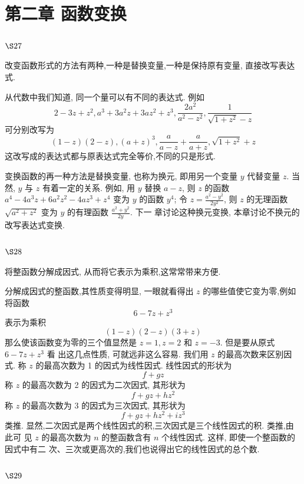 \chapter{第二章 函数变换}

\section{$\S 27$}

改变函数形式的方法有两种,一种是替换变量,一种是保持原有变量, 直接改写表达 式.

从代数中我们知道, 同一个量可以有不同的表达式. 例如
\[
2-3 z+z^{2}, a^{3}+3 a^{2} z+3 a z^{2}+z^{3}, \frac{2 a^{2}}{a^{2}-z^{2}}, \frac{1}{\sqrt{1+z^{2}}-z}
\]
可分别改写为
\[
(1-z)(2-z),(a+z)^{3}, \frac{a}{a-z}+\frac{a}{a+z}, \sqrt{1+z^{2}}+z
\]
这改写成的表达式都与原表达式完全等价,不同的只是形式.

变换函数的再一种方法是替换变量, 也称为换元, 即用另一个变量 $y$ 代替变量 $z$. 当 然, $y$ 与 $z$ 有着一定的关系. 例如, 用 $y$ 替换 $a-z$, 则 $z$ 的函数 $a^{4}-4 a^{3} z+6 a^{2} z^{2}-4 a z^{3}+z^{4}$ 变为 $y$ 的函数 $y^{4}$; 令 $z=\frac{a^{2}-y^{2}}{2 y^{2}}$, 则 $z$ 的无理函数 $\sqrt{a^{2}+z^{2}}$ 变为 $y$ 的有理函数 $\frac{a^{2}+y^{2}}{2 y}$. 下一 章讨论这种换元变换, 本章讨论不换元的改写表达式变换.

\section{$\S 28$}

将整函数分解成因式, 从而将它表示为乘积,这常常带来方便.

分解成因式的整函数,其性质变得明显, 一眼就看得出 $z$ 的哪些值使它变为零,例如 将函数
\[
6-7 z+z^{3}
\]
表示为乘积
\[
(1-z)(2-z)(3+z)
\]
那么使该函数变为零的三个值显然是 $z=1, z=2$ 和 $z=-3$. 但是要从原式 $6-7 z+z^{3}$ 看 出这几点性质, 可就远非这么容易. 我们用 $z$ 的最高次数来区别因式. 称 $z$ 的最高次数为 1 的因式为线性因式. 线性因式的形状为 
\[
f+g z
\]
称 $z$ 的最高次数为 2 的因式为二次因式, 其形状为
\[
f+g z+h z^{2}
\]
称 $z$ 的最高次数为 3 的因式为三次因式, 其形状为
\[
f+g z+h z^{2}+i z^{3}
\]
类推. 显然,二次因式是两个线性因式的积,三次因式是三个线性因式的积. 类推,由此可 见 $z$ 的最高次数为 $n$ 的整函数含有 $n$ 个线性因式. 这样, 即使一个整函数的因式中有二 次、三次或更高次的,我们也说得出它的线性因式的总个数.

\section{$\S 29$}

